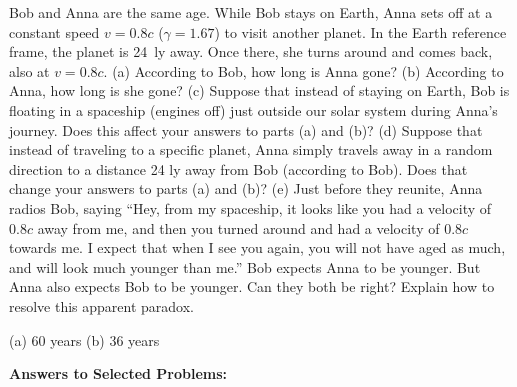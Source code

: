 \begin{Exercise}[difficulty=0]
Bob and Anna are the same age.  While Bob stays on Earth, Anna sets off at a constant speed $v=0.8c$ ($\gamma=1.67$) to visit another planet.  In the Earth reference frame, the planet is 24~ly away.  Once there, she turns around and comes back, also at $v=0.8c$.  (a) According to Bob, how long is Anna gone?  (b) According to Anna, how long is she gone?  (c) Suppose that instead of staying on Earth, Bob is floating in a spaceship (engines off) just outside our solar system during Anna's journey.  Does this affect your answers to parts (a) and (b)?  (d) Suppose that instead of traveling to a specific planet, Anna simply travels away in a random direction to a distance 24 ly away from Bob (according to Bob).  Does that change your answers to parts (a) and (b)?  (e) Just before they reunite, Anna radios Bob, saying ``Hey, from my spaceship, it looks like you had a velocity of $0.8c$ away from me, and then you turned around and had a velocity of $0.8c$ towards me.  I expect that when I see you again, you will not have aged as much, and will look much younger than me.''  Bob expects Anna to be younger.  But Anna also expects Bob to be younger.  Can they both be right?  Explain how to resolve this apparent paradox.
\end{Exercise}
\begin{Answer}
(a) 60 years (b) 36 years
\end{Answer}





\bigskip\bigskip\bigskip
\pagebreak[3]
\textbf{Answers to Selected {\thesubsection} Problems:}
\label{examples_prob_answers}
\shipoutAnswer

\cleardoublepage